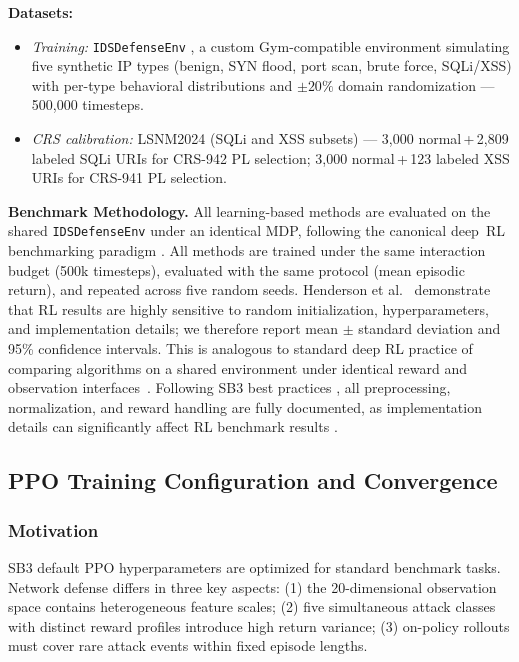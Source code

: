 \documentclass[conference]{IEEEtran}
\begin{document}
\textbf{Datasets:}
\begin{itemize}
  \item \textit{Training:} \texttt{IDSDefenseEnv} \cite{towers2023gymnasium},
    a custom Gym-compatible environment simulating five synthetic IP types
    (benign, SYN flood, port scan, brute force, SQLi/XSS) with per-type
    behavioral distributions and ${\pm}20\%$ domain randomization ---
    500,000 timesteps.
  \item \textit{CRS calibration:} LSNM2024 \cite{lashkari2024lsnm} (SQLi
    and XSS subsets) --- 3,000 normal\,+\,2,809 labeled SQLi URIs for
    CRS-942 PL selection; 3,000 normal\,+\,123 labeled XSS URIs for
    CRS-941 PL selection.
\end{itemize}

\textbf{Benchmark Methodology.}
All learning-based methods are evaluated on the shared \texttt{IDSDefenseEnv}
under an identical MDP, following the canonical deep~RL
benchmarking paradigm \cite{mnih2015dqn,towers2023gymnasium}. All methods
are trained under the same interaction budget (500k timesteps), evaluated
with the same protocol (mean episodic return), and repeated across five
random seeds. Henderson et al.\ \cite{henderson2018deeprl} demonstrate that
RL results are highly sensitive to random initialization, hyperparameters,
and implementation details; we therefore report mean $\pm$ standard
deviation and 95\% confidence intervals.
This is analogous to standard deep RL practice of comparing algorithms on a
shared environment under identical reward and observation interfaces~\cite{mnih2015dqn}.
Following SB3 best practices \cite{raffin2021sb3}, all preprocessing,
normalization, and reward handling are fully documented, as implementation
details can significantly affect RL benchmark results \cite{engstrom2020}.

\subsection{PPO Training Configuration and Convergence}

\subsubsection{Motivation}
SB3 default PPO hyperparameters are optimized for standard benchmark tasks.
Network defense differs in three key aspects: (1) the 20-dimensional
observation space contains heterogeneous feature scales; (2) five simultaneous
attack classes with distinct reward profiles introduce high return variance;
(3) on-policy rollouts must cover rare attack events within fixed episode
lengths.
\end{document}
